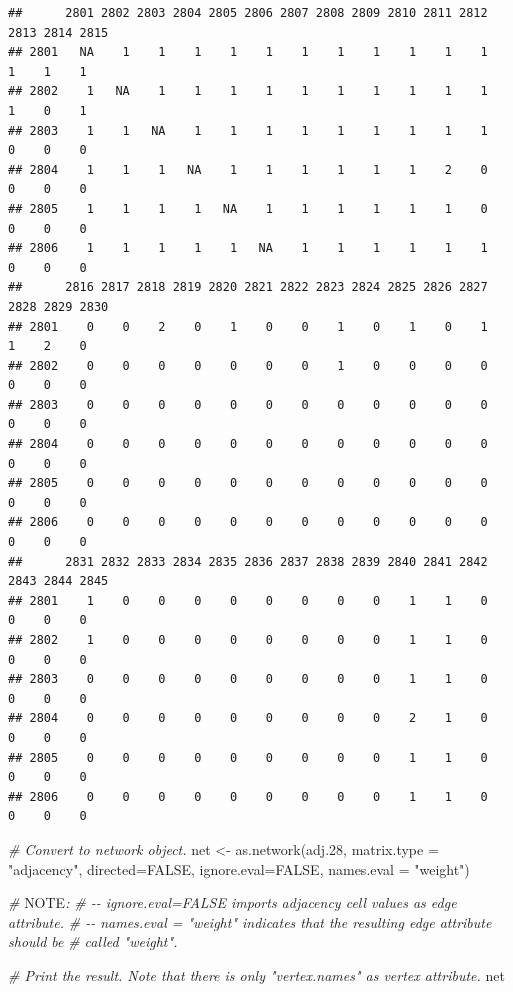 \documentclass[
]{book}
\newenvironment{Shaded}{\begin{snugshade}}{\end{snugshade}}
\newcommand{\AlertTok}[1]{\textcolor[rgb]{0.94,0.16,0.16}{#1}}
\newcommand{\AttributeTok}[1]{\textcolor[rgb]{0.77,0.63,0.00}{#1}}
\newcommand{\CommentTok}[1]{\textcolor[rgb]{0.56,0.35,0.01}{\textit{#1}}}
\newcommand{\ConstantTok}[1]{\textcolor[rgb]{0.00,0.00,0.00}{#1}}
\newcommand{\FloatTok}[1]{\textcolor[rgb]{0.00,0.00,0.81}{#1}}
\newcommand{\FunctionTok}[1]{\textcolor[rgb]{0.00,0.00,0.00}{#1}}
\newcommand{\NormalTok}[1]{#1}
\newcommand{\OtherTok}[1]{\textcolor[rgb]{0.56,0.35,0.01}{#1}}
\newcommand{\StringTok}[1]{\textcolor[rgb]{0.31,0.60,0.02}{#1}}
\begin{document}
\begin{verbatim}
##      2801 2802 2803 2804 2805 2806 2807 2808 2809 2810 2811 2812 2813 2814 2815
## 2801   NA    1    1    1    1    1    1    1    1    1    1    1    1    1    1
## 2802    1   NA    1    1    1    1    1    1    1    1    1    1    1    0    1
## 2803    1    1   NA    1    1    1    1    1    1    1    1    1    0    0    0
## 2804    1    1    1   NA    1    1    1    1    1    1    2    0    0    0    0
## 2805    1    1    1    1   NA    1    1    1    1    1    1    0    0    0    0
## 2806    1    1    1    1    1   NA    1    1    1    1    1    1    0    0    0
##      2816 2817 2818 2819 2820 2821 2822 2823 2824 2825 2826 2827 2828 2829 2830
## 2801    0    0    2    0    1    0    0    1    0    1    0    1    1    2    0
## 2802    0    0    0    0    0    0    0    1    0    0    0    0    0    0    0
## 2803    0    0    0    0    0    0    0    0    0    0    0    0    0    0    0
## 2804    0    0    0    0    0    0    0    0    0    0    0    0    0    0    0
## 2805    0    0    0    0    0    0    0    0    0    0    0    0    0    0    0
## 2806    0    0    0    0    0    0    0    0    0    0    0    0    0    0    0
##      2831 2832 2833 2834 2835 2836 2837 2838 2839 2840 2841 2842 2843 2844 2845
## 2801    1    0    0    0    0    0    0    0    0    1    1    0    0    0    0
## 2802    1    0    0    0    0    0    0    0    0    1    1    0    0    0    0
## 2803    0    0    0    0    0    0    0    0    0    1    1    0    0    0    0
## 2804    0    0    0    0    0    0    0    0    0    2    1    0    0    0    0
## 2805    0    0    0    0    0    0    0    0    0    1    1    0    0    0    0
## 2806    0    0    0    0    0    0    0    0    0    1    1    0    0    0    0
\end{verbatim}

\begin{Shaded}
\begin{Highlighting}[]
\CommentTok{\# Convert to network object.}
\NormalTok{net }\OtherTok{\textless{}{-}} \FunctionTok{as.network}\NormalTok{(adj}\FloatTok{.28}\NormalTok{, }\AttributeTok{matrix.type =} \StringTok{"adjacency"}\NormalTok{, }\AttributeTok{directed=}\ConstantTok{FALSE}\NormalTok{, }
                  \AttributeTok{ignore.eval=}\ConstantTok{FALSE}\NormalTok{, }\AttributeTok{names.eval =} \StringTok{"weight"}\NormalTok{)}

\CommentTok{\# }\AlertTok{NOTE}\CommentTok{: }
\CommentTok{\# {-}{-} ignore.eval=FALSE imports adjacency cell values as edge attribute.}
\CommentTok{\# {-}{-} names.eval = "weight" indicates that the resulting edge attribute should be}
\CommentTok{\# called "weight".}

\CommentTok{\# Print the result. Note that there is only "vertex.names" as vertex attribute.}
\NormalTok{net}
\end{Highlighting}
\end{Shaded}
\end{document}
